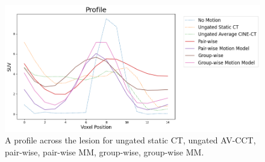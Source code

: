             \begin{figure}
                \centering
                
                \includegraphics[width=1.0\linewidth]{figures/motion_correction_1_results_3_profile.png}
                
                \captionsetup{singlelinecheck=false}
                \caption{
                    A profile across the lesion for ungated static \gls{CT}, ungated \gls{AV-CCT}, pair-wise, pair-wise \gls{MM}, group-wise, group-wise \gls{MM}.
                }
                \label{fig:comparison_of_motion_correction_methods_incorporating_motion_modelling_for_pet_ct_using_a_single_breath_hold_attenuation_map_results_profile}
            \end{figure}
            
